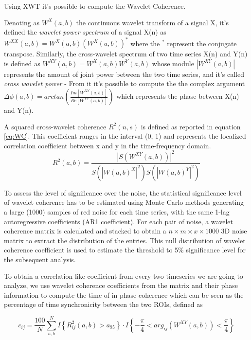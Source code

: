 \documentclass[a4paper,11pt]{article}
\begin{document}
Using XWT it's possible to compute the Wavelet Coherence.

Denoting as $W^{X}(a, b)$ the continuous wavelet transform of a signal X, it's defined the \emph{wavelet power spectrum} of a signal X(n) as $W^{XX}(a, b) = W^X(a, b) \left(W^X(a, b)\right)^{\ast}$ where the $^{\ast}$ represent the conjugate transpose.
Similarly, the cross-wavelet spectrum of two time series X(n) and Y(n) is defined as $W^{XY}(a, b) = W^X(a, b)W^Y(a, b)$ whose module $|W^{XY}(a, b)|$ represents the amount of joint power between the two time series, and it's called \emph{cross wavelet power}
-
From it it's possible to compute the the complex argument $\Delta \phi (a, b) = arctan\left(\frac{Im\left[ W^{XY}(a, b)\right]}{Re\left[ W^{XY}(a, b)\right]} \right)$ which represents the phase between X(n) and Y(n).

A squared cross-wavelet coherence $R^2(n, s)$ is defined as reported in equation \ref{eq:WC}. This coefficient ranges in the interval (0, 1) and represents the localized correlation coefficient between x and y in the time-frequency domain.
\begin{equation}
R^2(a, b) = \frac{|S(W^{XY}(a,b))|^2}{S(|W(a,b)^X|^2) S(|W(a,b)^Y|^2)}
\label{eq:WC}
\end{equation}

To assess the level of significance over the noise, the statistical significance level of wavelet coherence has to be estimated using Monte Carlo methods generating a large (1000) samples of red noise for each time series, with the same 1-lag autoregressive coefficients (AR1 coefficient). For each pair of noise, a wavelet coherence matrix is calculated and stacked to obtain a $n\times m \times x \times 1000$ 3D noise matrix to extract the distribution of the entries. This null distribution of wavelet coherence coefficient is used to estimate the threshold to 5\% significance level for the subsequent analysis.

To obtain a correlation-like coefficient from every two timeseries we are going to analyze, we use wavelet coherence coefficients from the matrix and their phase information to compute the time of in-phase coherence which can be seen as the percentage of time synchronicity between the two ROIs, defined as

\begin{equation} \label{eq:wcohcoefficients}
c_{ij} = \frac{100}{N}\sum_{a, b}^N I\left\{ R_{ij}^2(a,b) > a_{95}\right\}\cdot I\left\{-\frac{\pi}{4}<arg_{ij}(W^{XY}(a, b)) < \frac{\pi}{4}  \right\}
\end{equation}
\end{document}
